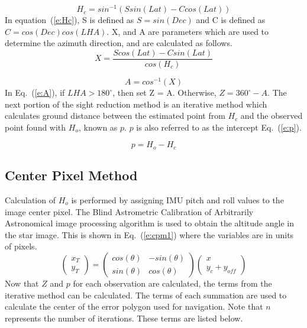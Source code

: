 \documentclass[]{aiaa-tc}%
\begin{document}
\begin{equation}
 \label{e:Hc}
    H_{c} = sin^{-1}(Ssin(Lat) - Ccos(Lat))
\end{equation}
In equation~(\ref{e:Hc}), S is defined as $S = sin(Dec)$ and C is defined as $C = cos(Dec)cos(LHA)$.
X, and A are parameters which are used to determine the azimuth direction, and are calculated as follows.
\begin{equation}
 \label{e:X}
    X = \frac{Scos(Lat) - Csin(Lat)}{cos(H_{c})}
\end{equation}

\begin{equation}
 \label{e:A}
    A = cos^{-1}(X)
\end{equation}
In Eq.~(\ref{e:A}), if $LHA > 180^{\circ}$, then set Z = A.  Otherwise, $Z = 360^{\circ} -A$.  The next portion of the sight reduction method is an iterative method which calculates ground distance between the estimated point from $H_c$ and the observed point found with $H_{o}$, known as $p$. $p$ is also referred to as the intercept Eq.~(\ref{e:p}).

\begin{equation}
 \label{e:p}
    p = H_{o} - H_{c}
\end{equation}
\subsection{Center Pixel Method}
Calculation of $H_{o}$ is performed by assigning IMU pitch and roll values to the image center pixel. The Blind Astrometric Calibration of Arbitrarily Astronomical image processing algorithm is used to obtain the altitude angle in the star image\cite{b:astrometry}. This is shown in Eq.~(\ref{e:cpm1}) where the variables are in units of pixels.
\begin{equation}
    \label{e:cpm1}
       \begin{pmatrix} 
  x_{T}     \\ 
  y_{T} 
\end{pmatrix}=\begin{pmatrix} 
  cos(\theta)     & -sin(\theta)\\ 
  sin(\theta) & cos(\theta) 
\end{pmatrix}\begin{pmatrix} 
  x\\ 
  y_{c} + y_{off} 
\end{pmatrix}
\end{equation}
Now that $Z$ and $p$ for each observation are calculated, the terms from the iterative method can be calculated. The terms of each summation are used to calculate the center of the error polygon used for navigation.  Note that $n$ represents the number of iterations.  These terms are listed below.  
\end{document}
